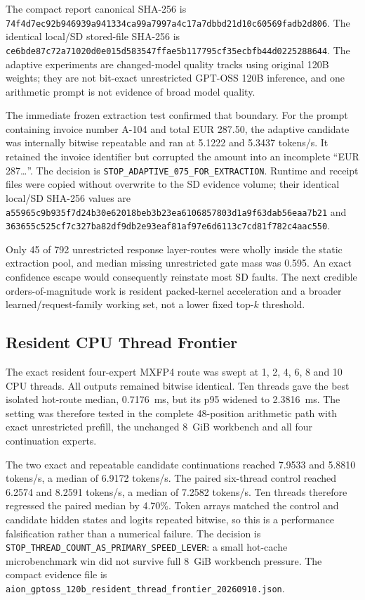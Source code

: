 The compact report canonical SHA-256 is
\texttt{74f4d7ec92b946939a941334ca99a7997a4c17a7dbbd21d10c60569fadb2d806}.
The identical local/SD stored-file SHA-256 is
\texttt{ce6bde87c72a71020d0e015d583547ffae5b117795cf35ecbfb44d0225288644}.
The adaptive experiments are changed-model quality tracks using original 120B
weights; they are not bit-exact unrestricted GPT-OSS 120B inference, and one
arithmetic prompt is not evidence of broad model quality.

The immediate frozen extraction test confirmed that boundary.  For the prompt
containing invoice number A-104 and total EUR 287.50, the adaptive candidate was
internally bitwise repeatable and ran at 5.1222 and 5.3437 tokens/s.  It retained
the invoice identifier but corrupted the amount into an incomplete ``EUR
287\ldots''.  The decision is
\texttt{STOP\_ADAPTIVE\_075\_FOR\_EXTRACTION}.  Runtime and receipt files were
copied without overwrite to the SD evidence volume; their identical local/SD
SHA-256 values are
\texttt{a55965c9b935f7d24b30e62018beb3b23ea6106857803d1a9f63dab56eaa7b21}
and
\texttt{363655c525cf7c327ba82df9db2e93eaf81af97e6d6113c7cd81f782c4aac550}.

Only 45 of 792 unrestricted response layer-routes were wholly inside the static
extraction pool, and median missing unrestricted gate mass was 0.595.  An exact
confidence escape would consequently reinstate most SD faults.  The next
credible orders-of-magnitude work is resident packed-kernel acceleration and a
broader learned/request-family working set, not a lower fixed top-$k$ threshold.

\subsection{Resident CPU Thread Frontier}

The exact resident four-expert MXFP4 route was swept at 1, 2, 4, 6, 8 and
10 CPU threads.  All outputs remained bitwise identical.  Ten threads gave the
best isolated hot-route median, 0.7176~ms, but its p95 widened to 2.3816~ms.
The setting was therefore tested in the complete 48-position arithmetic path
with exact unrestricted prefill, the unchanged 8~GiB workbench and all four
continuation experts.

The two exact and repeatable candidate continuations reached 7.9533 and
5.8810 tokens/s, a median of 6.9172 tokens/s.  The paired six-thread control
reached 6.2574 and 8.2591 tokens/s, a median of 7.2582 tokens/s.  Ten threads
therefore regressed the paired median by 4.70\%.  Token arrays matched the
control and candidate hidden states and logits repeated bitwise, so this is a
performance falsification rather than a numerical failure.  The decision is
\texttt{STOP\_THREAD\_COUNT\_AS\_PRIMARY\_SPEED\_LEVER}: a small hot-cache
microbenchmark win did not survive full 8~GiB workbench pressure.  The compact
evidence file is
\texttt{aion\_gptoss\_120b\_resident\_thread\_frontier\_20260910.json}.


